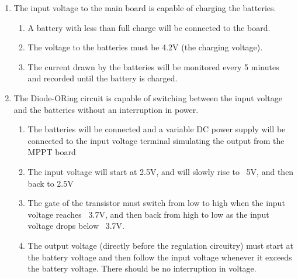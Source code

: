 \documentclass{article}
\numberwithin{figure}{section}
\numberwithin{equation}{section}
\begin{document}
{\begin{enumerate}[align=left,leftmargin=*, labelindent= 0em, label=\textbf{\CheckBox{} Item \thesubsubsection.\arabic*.}, itemindent=0em]
\begin{enumerate}[label=\CheckBox{}]
\begin{itemize}
                    \item Humidity = 50\%
                \end{itemize}
            \item The data appearing on the phone screen must match the hard-coded values for temperature and humidity.
            \item As a backup plan, in case the FT230X chip will not communicate with the Android phone, an Arduino using the same chip and the FT232R chip will be used to demonstrate data transfer capabilities (using only the temperature sensor). In this scenario, the board using the FT230X chip \emph{will} be hooked up to a computer to demonstrate that it can also send serial data.
        \end{enumerate}
    \item \label{val5}The input voltage to the main board is capable of charging the batteries.
        \begin{enumerate}[label=\CheckBox{}]
            \item A battery with less than full charge will be connected to the board.
            \item The voltage to the batteries must be 4.2V (the charging voltage).
            \item The current drawn by the batteries will be monitored every 5 minutes and recorded until the battery is charged.
        \end{enumerate}
    \item \label{val6}The Diode-ORing circuit is capable of switching between the input voltage and the batteries without an interruption in power.
        \begin{enumerate}[label=\CheckBox{}]
            \item The batteries will be connected and a variable DC power supply will be connected to the input voltage terminal simulating the output from the MPPT board
            \item The input voltage will start at 2.5V, and will slowly rise to ~5V, and then back to 2.5V
            \item The gate of the transistor must switch from low to high when the input voltage reaches ~3.7V, and then back from high to low as the input voltage drops below ~3.7V.
            \item The output voltage (directly before the regulation circuitry) must start at the battery voltage and then follow the input voltage whenever it exceeds the battery voltage. There should be no interruption in voltage.

\end{enumerate}
\end{enumerate}}
\end{document}
